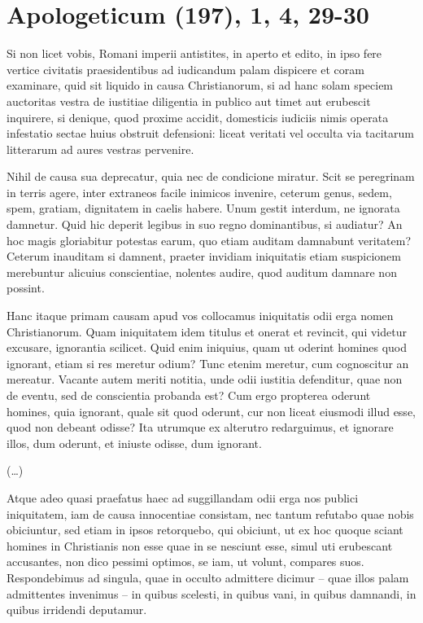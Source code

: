 
\section*{Apologeticum (197), 1, 4, 29-30}

Si non licet vobis, Romani imperii antistites, in aperto et edito, in ipso fere vertice civitatis praesidentibus ad iudicandum palam dispicere et coram examinare, quid sit liquido in causa Christianorum, si ad hanc solam speciem auctoritas vestra de iustitiae diligentia in publico aut timet aut erubescit inquirere, si denique, quod proxime accidit, domesticis iudiciis nimis operata infestatio sectae huius obstruit defensioni: liceat veritati vel occulta via tacitarum litterarum ad aures vestras pervenire.

Nihil de causa sua deprecatur, quia nec de condicione miratur. Scit se peregrinam in terris agere, inter extraneos facile inimicos invenire, ceterum genus, sedem, spem, gratiam, dignitatem in caelis habere. Unum gestit interdum, ne ignorata damnetur. Quid hic deperit legibus in suo regno dominantibus, si audiatur? An hoc magis gloriabitur potestas earum, quo etiam auditam damnabunt veritatem? Ceterum inauditam si damnent, praeter invidiam iniquitatis etiam suspicionem merebuntur alicuius conscientiae, nolentes audire, quod auditum damnare non possint.

Hanc itaque primam causam apud vos collocamus iniquitatis odii erga nomen Christianorum. Quam iniquitatem idem titulus et onerat et revincit, qui videtur excusare, ignorantia scilicet. Quid enim iniquius, quam ut oderint homines quod ignorant, etiam si res meretur odium? Tunc etenim meretur, cum cognoscitur an mereatur.  Vacante autem meriti notitia, unde odii iustitia defenditur, quae non de eventu, sed de conscientia probanda est? Cum ergo propterea oderunt homines, quia ignorant, quale sit quod oderunt, cur non liceat eiusmodi illud esse, quod non debeant odisse? Ita utrumque ex alterutro redarguimus, et ignorare illos, dum oderunt, et iniuste odisse, dum ignorant.

(\dots)

Atque adeo quasi praefatus haec ad suggillandam odii erga nos publici iniquitatem, iam de causa innocentiae consistam, nec tantum refutabo quae nobis obiciuntur, sed etiam in ipsos retorquebo, qui obiciunt, ut ex hoc quoque sciant homines in Christianis non esse quae in se nesciunt esse, simul uti erubescant accusantes, non dico pessimi optimos, se iam, ut volunt, compares suos. Respondebimus ad singula, quae in occulto admittere dicimur – quae illos palam admittentes invenimus – in quibus scelesti, in quibus vani, in quibus damnandi, in quibus irridendi deputamur.

